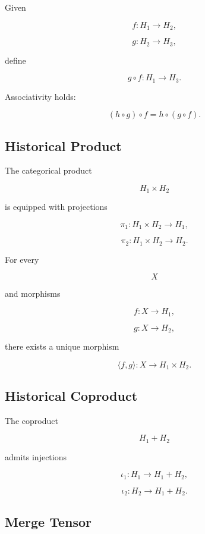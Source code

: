 \documentclass[12pt,oneside]{article}
\theoremstyle{definition}
\theoremstyle{remark}
\begin{document}
Given

\[
f:H_1\rightarrow H_2,
\]

\[
g:H_2\rightarrow H_3,
\]

define

\[
g\circ f:H_1\rightarrow H_3.
\]

Associativity holds:

\[
(h\circ g)\circ f
=
h\circ(g\circ f).
\]

\subsection*{Historical Product}

The categorical product

\[
H_1\times H_2
\]

is equipped with projections

\[
\pi_1:H_1\times H_2\rightarrow H_1,
\]

\[
\pi_2:H_1\times H_2\rightarrow H_2.
\]

For every

\[
X
\]

and morphisms

\[
f:X\rightarrow H_1,
\]

\[
g:X\rightarrow H_2,
\]

there exists a unique morphism

\[
\langle f,g\rangle
:
X
\rightarrow
H_1\times H_2.
\]

\subsection*{Historical Coproduct}

The coproduct

\[
H_1+H_2
\]

admits injections

\[
\iota_1
:
H_1
\rightarrow
H_1+H_2,
\]

\[
\iota_2
:
H_2
\rightarrow
H_1+H_2.
\]

\subsection*{Merge Tensor}
\end{document}
